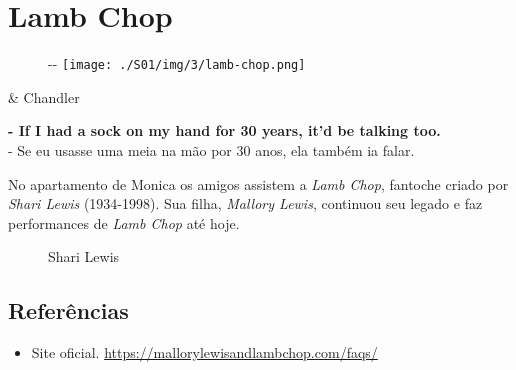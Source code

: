\hypertarget{lamb-chop}{%
\section{Lamb Chop}\label{lamb-chop}}

\begin{figure}[!ht]
  \begin{adjustwidth}{-\oddsidemargin-1in}{-\rightmargin}
    \centering
    \texttt{[image: ./S01/img/3/lamb-chop.png]}
  \end{adjustwidth}
\end{figure}

\begin{tcolorbox}[enhanced,center upper,
    drop fuzzy shadow southeast, boxrule=0.3pt,
    lower separated=false,
    colframe=black!30!dialogoBorder,colback=white]
\begin{minipage}[c]{0.16\linewidth}
   & \centering \scriptsize{Chandler}
\end{minipage}
\hfill
\begin{minipage}[c]{0.8\linewidth}
  \textbf{- If I had a sock on my hand for 30 years, it'd be talking too.}\\
  - Se eu usasse uma meia na mão por 30 anos, ela também ia falar.
\end{minipage}
\end{tcolorbox}

No apartamento de Monica os amigos assistem a \emph{Lamb Chop}, fantoche
criado por \emph{Shari Lewis} (1934-1998). Sua filha, \emph{Mallory
Lewis}, continuou seu legado e faz performances de \emph{Lamb Chop} até
hoje.

\begin{figure}
  \centering
    \caption{Shari Lewis\label{fig:shari-lewis}}
\end{figure}

\hypertarget{referuxeancias-5}{%
\subsection{Referências}\label{referuxeancias-5}}

\begin{itemize}
\tightlist
\item
  \sloppy Site oficial. \url{https://mallorylewisandlambchop.com/faqs/}
\end{itemize}

